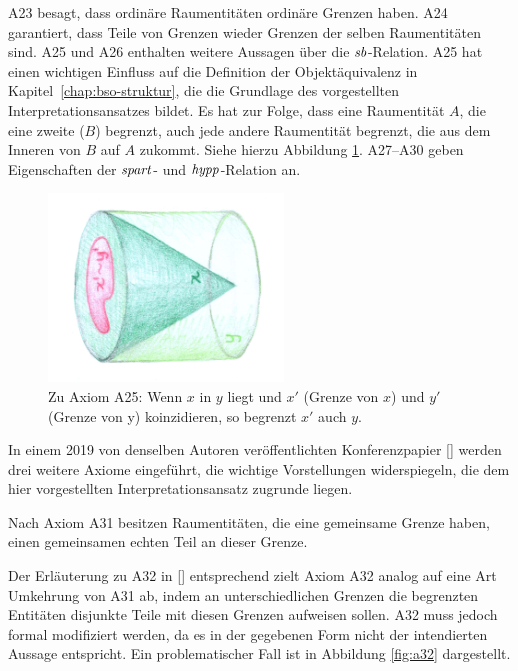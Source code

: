 A23
besagt, dass ordinäre Raumentitäten ordinäre Grenzen haben.
A24 garantiert, dass Teile von Grenzen wieder Grenzen der selben Raumentitäten sind.
A25 und A26 enthalten weitere Aussagen über die $\mathit{sb}$-Relation.
A25 hat einen wichtigen Einfluss auf die Definition der Objektäquivalenz in Kapitel~\ref{chap:bso-struktur}, die die Grundlage des vorgestellten Interpretationsansatzes bildet.
Es hat zur Folge, dass eine Raumentität $A$, die eine zweite ($B$) begrenzt, auch jede andere Raumentität begrenzt, die \glqq aus dem Inneren von $B$ auf $A$ zukommt\grqq .
Siehe hierzu Abbildung \ref{fig:A25}.
A27--A30
geben Eigenschaften der $\mathit{spart}$- und $\mathit{hypp}$-Relation an.


    \begin{figure}[ht]
        \centering
        \includegraphics[height=5cm]{abb/a25.png}
        \caption[Zu Axiom 25]{Zu Axiom A25: Wenn $x$ in $y$ liegt und $x'$ (Grenze von $x$) und $y'$ (Grenze von y) koinzidieren, so begrenzt $x'$ auch $y$.}
        \label{fig:A25}
    \end{figure}
    
    In
    einem 2019 von denselben Autoren veröffentlichten Konferenzpapier [\cite{baumann-r-2019--a}] werden drei weitere Axiome eingeführt, die wichtige Vorstellungen widerspiegeln, die dem hier vorgestellten Interpretationsansatz zugrunde liegen.
    
    Nach Axiom A31 besitzen Raumentitäten, die eine gemeinsame Grenze haben, einen gemeinsamen echten Teil an dieser Grenze.
    
    Der Erläuterung zu A32 in [\cite{baumann-r-2019--a}] entsprechend zielt Axiom A32
		analog auf eine Art Umkehrung von A31 ab,
		indem an unterschiedlichen Grenzen die begrenzten Entitäten disjunkte Teile 
		mit diesen Grenzen aufweisen sollen.
    A32 muss jedoch formal modifiziert werden, da es in der gegebenen Form nicht der intendierten Aussage entspricht. Ein problematischer Fall ist in Abbildung \ref{fig:a32} dargestellt.
    
